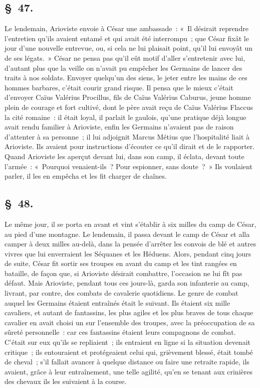 \documentclass[french,twoside]{book} %
\begin{document}
\subsection[{§ 47.}]{ \textsc{§ 47.} }
\noindent Le lendemain, Arioviste envoie à César une ambassade : « Il désirait reprendre l’entretien qu’ils avaient entamé et qui avait été interrompu ; que César fixât le jour d’une nouvelle entrevue, ou, si cela ne lui plaisait point, qu’il lui envoyât un de ses légats. » César ne pensa pas qu’il eût motif d’aller s’entretenir avec lui, d’autant plus que la veille on n’avait pu empêcher les Germains de lancer des traits à nos soldats. Envoyer quelqu’un des siens, le jeter entre les mains de ces hommes barbares, c’était courir grand risque. Il pensa que le mieux c’était d’envoyer Caïus Valérius Procillus, fils de Caïus Valérius Caburus, jeune homme plein de courage et fort cultivé, dont le père avait reçu de Caïus Valérius Flaccus la cité romaine : il était loyal, il parlait le gaulois, qu’une pratique déjà longue avait rendu familier à Arioviste, enfin les Germains n’avaient pas de raison d’attenter à sa personne ; il lui adjoignit Marcus Métius que l’hospitalité liait à Arioviste. Ils avaient pour instructions d’écouter ce qu’il dirait et de le rapporter. Quand Arioviste les aperçut devant lui, dans son camp, il éclata, devant toute l’armée : « Pourquoi venaient-ils ? Pour espionner, sans doute ? » Ils voulaient parler, il les en empêcha et les fit charger de chaînes.
\subsection[{§ 48.}]{ \textsc{§ 48.} }
\noindent Le même jour, il se porta en avant et vint s’établir à six milles du camp de César, au pied d’une montagne. Le lendemain, il passa devant le camp de César et alla camper à deux milles au-delà, dans la pensée d’arrêter les convois de blé et autres vivres que lui enverraient les Séquanes et les Héduens. Alors, pendant cinq jours de suite, César fit sortir ses troupes en avant du camp et les tint rangées en bataille, de façon que, si Arioviste désirait combattre, l’occasion ne lui fît pas défaut. Mais Arioviste, pendant tous ces jours-là, garda son infanterie au camp, livrant, par contre, des combats de cavalerie quotidiens. Le genre de combat auquel les Germains étaient entraînés était le suivant. Ils étaient six mille cavaliers, et autant de fantassins, les plus agiles et les plus braves de tous chaque cavalier en avait choisi un sur l’ensemble des troupes, avec la préoccupation de sa sûreté personnelle : car ces fantassins étaient leurs compagnons de combat. C'était sur eux qu’ils se repliaient ; ils entraient en ligne si la situation devenait critique ; ils entouraient et protégeaient celui qui, grièvement blessé, était tombé de cheval ; s’il fallait avancer à quelque distance ou faire une retraite rapide, ils avaient, grâce à leur entraînement, une telle agilité, qu’en se tenant aux crinières des chevaux ils les suivaient à la course.
\end{document}
